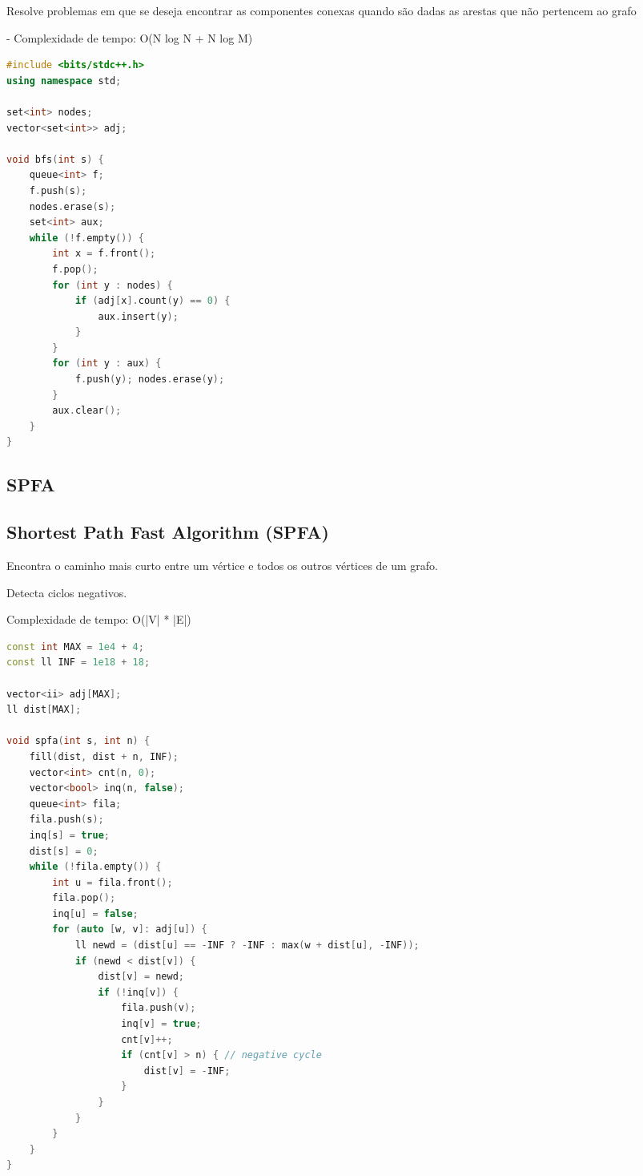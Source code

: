 \documentclass[11pt, a4paper, twoside]{article}
\begin{document}
Resolve problemas em que se deseja encontrar as componentes conexas quando são dadas as arestas que não pertencem ao grafo

- Complexidade de tempo: O(N log N + N log M)

\begin{multicols}{2}
\begin{lstlisting}[language=C++]
#include <bits/stdc++.h>
using namespace std;

set<int> nodes;
vector<set<int>> adj;

void bfs(int s) {
    queue<int> f;
    f.push(s);
    nodes.erase(s);
    set<int> aux;
    while (!f.empty()) {
        int x = f.front();
        f.pop();
        for (int y : nodes) {
            if (adj[x].count(y) == 0) {
                aux.insert(y);
            }
        }
        for (int y : aux) {
            f.push(y); nodes.erase(y);
        }
        aux.clear();
    }
}
\end{lstlisting}
\end{multicols}

\subsection{SPFA}

\subsection{Shortest Path Fast Algorithm (SPFA)}


Encontra o caminho mais curto entre um vértice e todos os outros vértices de um grafo.

Detecta ciclos negativos.

Complexidade de tempo: O(|V| * |E|)

\begin{lstlisting}[language=C++]
const int MAX = 1e4 + 4;
const ll INF = 1e18 + 18;

vector<ii> adj[MAX];
ll dist[MAX];

void spfa(int s, int n) {
    fill(dist, dist + n, INF);
    vector<int> cnt(n, 0);
    vector<bool> inq(n, false);
    queue<int> fila;
    fila.push(s);
    inq[s] = true;
    dist[s] = 0;
    while (!fila.empty()) {
        int u = fila.front();
        fila.pop();
        inq[u] = false;
        for (auto [w, v]: adj[u]) {
            ll newd = (dist[u] == -INF ? -INF : max(w + dist[u], -INF));
            if (newd < dist[v]) {
                dist[v] = newd;
                if (!inq[v]) {
                    fila.push(v);
                    inq[v] = true;
                    cnt[v]++;
                    if (cnt[v] > n) { // negative cycle
                        dist[v] = -INF;
                    }
                }
            }
        }
    }
}
\end{lstlisting}
\end{document}
